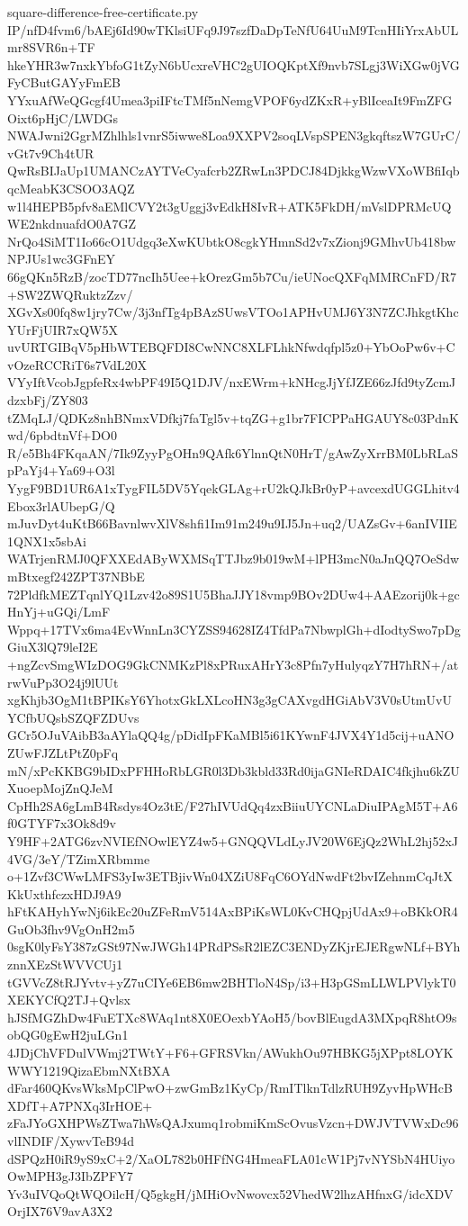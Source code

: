 \documentclass[11pt]{article}
\theoremstyle{definition}
\theoremstyle{remark}
\begin{document}
\begin{filecontents*}[overwrite]{square-difference-free-certificate.py}
IP/nfD4fvm6/bAEj6Id90wTKlsiUFq9J97szfDaDpTeNfU64UuM9TcnHIiYrxAbULmr8SVR6n+TF
hkeYHR3w7nxkYbfoG1tZyN6bUcxreVHC2gUIOQKptXf9nvb7SLgj3WiXGw0jVGFyCButGAYyFmEB
YYxuAfWeQGcgf4Umea3piIFtcTMf5nNemgVPOF6ydZKxR+yBlIceaIt9FmZFGOixt6pHjC/LWDGs
NWAJwni2GgrMZhlhls1vnrS5iwwe8Loa9XXPV2soqLVspSPEN3gkqftszW7GUrC/vGt7v9Ch4tUR
QwRsBIJaUp1UMANCzAYTVeCyafcrb2ZRwLn3PDCJ84DjkkgWzwVXoWBfiIqbqcMeabK3CSOO3AQZ
w1l4HEPB5pfv8aEMlCVY2t3gUggj3vEdkH8IvR+ATK5FkDH/mVslDPRMcUQWE2nkdnuafdO0A7GZ
NrQo4SiMT1Io66cO1Udgq3eXwKUbtkO8cgkYHmnSd2v7xZionj9GMhvUb418bwNPJUs1wc3GFnEY
66gQKn5RzB/zocTD77ncIh5Uee+kOrezGm5b7Cu/ieUNocQXFqMMRCnFD/R7+SW2ZWQRuktzZzv/
XGvXs00fq8w1jry7Cw/3j3nfTg4pBAzSUwsVTOo1APHvUMJ6Y3N7ZCJhkgtKhcYUrFjUIR7xQW5X
uvURTGIBqV5pHbWTEBQFDI8CwNNC8XLFLhkNfwdqfpl5z0+YbOoPw6v+CvOzeRCCRiT6s7VdL20X
VYyIftVcobJgpfeRx4wbPF49I5Q1DJV/nxEWrm+kNHcgJjYfJZE66zJfd9tyZcmJdzxbFj/ZY803
tZMqLJ/QDKz8nhBNmxVDfkj7faTgl5v+tqZG+g1br7FICPPaHGAUY8c03PdnKwd/6pbdtnVf+DO0
R/e5Bh4FKqaAN/7Ik9ZyyPgOHn9QAfk6YlnnQtN0HrT/gAwZyXrrBM0LbRLaSpPaYj4+Ya69+O3l
YygF9BD1UR6A1xTygFIL5DV5YqekGLAg+rU2kQJkBr0yP+avcexdUGGLhitv4Ebox3rlAUbepG/Q
mJuvDyt4uKtB66BavnlwvXlV8shfi1Im91m249u9IJ5Jn+uq2/UAZsGv+6anIVIIE1QNX1x5sbAi
WATrjenRMJ0QFXXEdAByWXMSqTTJbz9b019wM+lPH3mcN0aJnQQ7OeSdwmBtxegf242ZPT37NBbE
72PldfkMEZTqnlYQ1Lzv42o89S1U5BhaJJY18vmp9BOv2DUw4+AAEzorij0k+gcHnYj+uGQi/LmF
Wppq+17TVx6ma4EvWnnLn3CYZSS94628IZ4TfdPa7NbwplGh+dIodtySwo7pDgGiuX3lQ79leI2E
+ngZcvSmgWIzDOG9GkCNMKzPl8xPRuxAHrY3c8Pfn7yHulyqzY7H7hRN+/atrwVuPp3O24j9lUUt
xgKhjb3OgM1tBPIKsY6YhotxGkLXLcoHN3g3gCAXvgdHGiAbV3V0sUtmUvUYCfbUQsbSZQFZDUvs
GCr5OJuVAibB3aAYlaQQ4g/pDidIpFKaMBl5i61KYwnF4JVX4Y1d5cij+uANOZUwFJZLtPtZ0pFq
mN/xPcKKBG9bIDxPFHHoRbLGR0l3Db3kbld33Rd0ijaGNIeRDAIC4fkjhu6kZUXuoepMojZnQJeM
CpHh2SA6gLmB4Rsdys4Oz3tE/F27hIVUdQq4zxBiiuUYCNLaDiuIPAgM5T+A6f0GTYF7x3Ok8d9v
Y9HF+2ATG6zvNVIEfNOwlEYZ4w5+GNQQVLdLyJV20W6EjQz2WhL2hj52xJ4VG/3eY/TZimXRbmme
o+1Zvf3CWwLMFS3yIw3ETBjivWn04XZiU8FqC6OYdNwdFt2bvIZehnmCqJtXKkUxthfczxHDJ9A9
hFtKAHyhYwNj6ikEc20uZFeRmV514AxBPiKsWL0KvCHQpjUdAx9+oBKkOR4GuOb3fhv9VgOnH2m5
0sgK0lyFsY387zGSt97NwJWGh14PRdPSsR2lEZC3ENDyZKjrEJERgwNLf+BYhznnXEzStWVVCUj1
tGVVcZ8tRJYvtv+yZ7uCIYe6EB6mw2BHTloN4Sp/i3+H3pGSmLLWLPVlykT0XEKYCfQ2TJ+Qvlsx
hJSfMGZhDw4FuETXc8WAq1nt8X0EOexbYAoH5/bovBlEugdA3MXpqR8htO9sobQG0gEwH2juLGn1
4JDjChVFDulVWmj2TWtY+F6+GFRSVkn/AWukhOu97HBKG5jXPpt8LOYKWWY1219QizaEbmNXtBXA
dFar460QKvsWksMpClPwO+zwGmBz1KyCp/RmITlknTdlzRUH9ZyvHpWHcBXDfT+A7PNXq3IrHOE+
zFaJYoGXHPWsZTwa7hWsQAJxumq1robmiKmScOvusVzcn+DWJVTVWxDc96vlINDIF/XywvTeB94d
dSPQzH0iR9yS9xC+2/XaOL782b0HFfNG4HmeaFLA01cW1Pj7vNYSbN4HUiyoOwMPH3gJ3IbZPFY7
Yv3uIVQoQtWQOilcH/Q5gkgH/jMHiOvNwovcx52VhedW2lhzAHfnxG/idcXDVOrjIX76V9avA3X2

\end{filecontents*}
\end{document}
